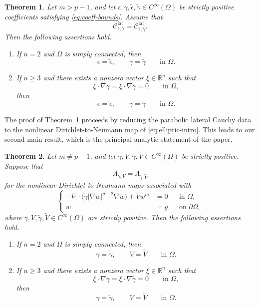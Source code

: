 \documentclass[a4paper,12pt]{article}
\newcommand{\pr}{\partial}
\newcommand{\R}{\mathbb{R}}
\newtheorem{thm}{Theorem}[section]
\theoremstyle{definition}
\theoremstyle{remark}
\begin{document}
\begin{thm}\label{thm:main-parabolic}
Let $m>p-1$, and let $\epsilon,\gamma,\tilde\epsilon,\tilde\gamma\in C^\infty(\Omega)$ be strictly positive coefficients satisfying \eqref{eq:coeff-bounds}. Assume that
\[
\mathcal C^{\mathrm{lat}}_{\epsilon,\gamma}=\mathcal C^{\mathrm{lat}}_{\tilde\epsilon,\tilde\gamma}.
\]
Then the following assertions hold.
\begin{enumerate}
\item If $n=2$ and $\Omega$ is simply connected, then
\[
\epsilon=\tilde\epsilon,\qquad \gamma=\tilde\gamma\qquad \text{in }\Omega.
\]
\item If $n\ge 3$ and there exists a nonzero vector $\xi\in\R^n$ such that
\[
\xi\cdot\nabla\gamma=\xi\cdot\nabla\tilde\gamma=0\qquad \text{in }\Omega,
\]
then
\[
\epsilon=\tilde\epsilon,\qquad \gamma=\tilde\gamma\qquad \text{in }\Omega.
\]
\end{enumerate}
\end{thm}

The proof of Theorem~\ref{thm:main-parabolic} proceeds by reducing the parabolic lateral Cauchy data to the nonlinear Dirichlet-to-Neumann map of \eqref{eq:elliptic-intro}. This leads to our second main result, which is the principal analytic statement of the paper.

\begin{thm}\label{thm:main-elliptic}
Let $m\neq p-1$, and let $\gamma,V,\tilde\gamma,\tilde V\in C^\infty(\Omega)$ be strictly positive. Suppose that
\[
\Lambda_{\gamma,V}=\Lambda_{\tilde\gamma,\tilde V}
\]
for the nonlinear Dirichlet-to-Neumann maps associated with
\begin{equation}\label{eq:elliptic-main}
\left\{
\begin{aligned}
-\nabla\cdot\bigl(\gamma|\nabla w|^{p-2}\nabla w\bigr)+Vw^m&=0 &&\text{in }\Omega,\\
 w&=g &&\text{on }\pr\Omega,
\end{aligned}
\right.
\end{equation}
where $\gamma,V,\tilde\gamma,\tilde V\in C^\infty(\Omega)$ are strictly positive. Then the following assertions hold.
\begin{enumerate}
\item If $n=2$ and $\Omega$ is simply connected, then
\[
\gamma=\tilde\gamma,\qquad V=\tilde V\qquad \text{in }\Omega.
\]
\item If $n\ge 3$ and there exists a nonzero vector $\xi\in\R^n$ such that
\[
\xi\cdot\nabla\gamma=\xi\cdot\nabla\tilde\gamma=0\qquad \text{in }\Omega,
\]
then
\[
\gamma=\tilde\gamma,\qquad V=\tilde V\qquad \text{in }\Omega.
\]
\end{enumerate}
\end{thm}
\end{document}
